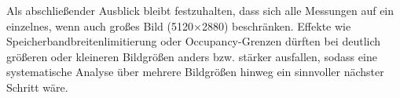 Als abschließender Ausblick bleibt festzuhalten, dass sich alle Messungen auf ein einzelnes,
wenn auch großes Bild (5120$\times$2880) beschränken. Effekte wie
Speicherbandbreitenlimitierung oder Occupancy-Grenzen dürften bei deutlich
größeren oder kleineren Bildgrößen anders bzw. stärker ausfallen, sodass eine
systematische Analyse über mehrere Bildgrößen hinweg ein sinnvoller nächster
Schritt wäre.